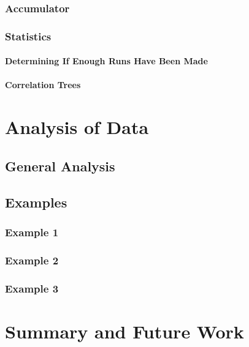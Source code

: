 \documentclass[12pt,twoside]{book}
\begin{document}
\subsection{Accumulator}

\subsection{Statistics}

\subsubsection{Determining If Enough Runs Have Been Made}

\subsubsection{Correlation Trees}

%
%

\chapter{Analysis of Data}

\section{General Analysis}

\section{Examples}

\subsection{Example 1}

\subsection{Example 2}

\subsection{Example 3}

%
%

\chapter{Summary and Future Work}
\end{document}
